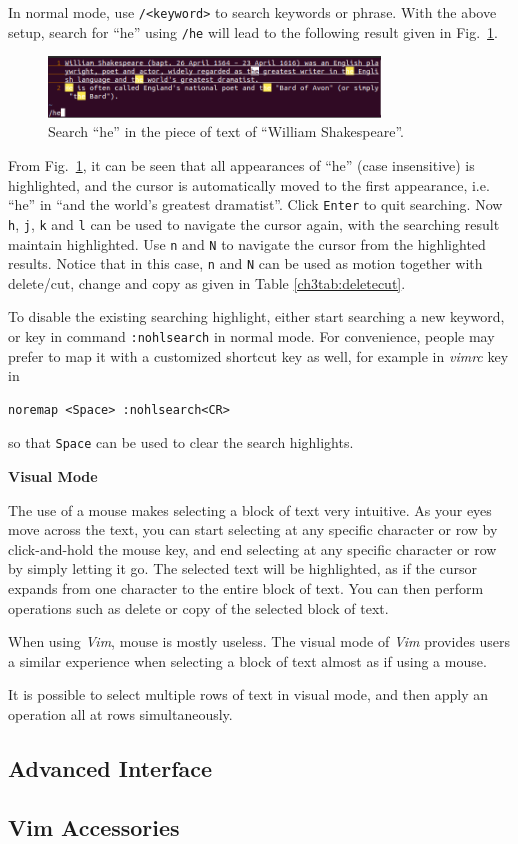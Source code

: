 In normal mode, use \verb|/<keyword>| to search keywords or phrase. With the above setup, search for ``he'' using \verb|/he| will lead to the following result given in Fig.~\ref{ch3fig:vimdemo2}.
\begin{figure}
\centering
\includegraphics[width=250pt]{chapters/chapter3/figures/vimdemo2.png}
\caption{Search ``he'' in the piece of text of ``William Shakespeare''.} \label{ch3fig:vimdemo2}
\end{figure}
From Fig.~\ref{ch3fig:vimdemo2}, it can be seen that all appearances of ``he'' (case insensitive) is highlighted, and the cursor is automatically moved to the first appearance, i.e. ``he'' in ``and the world's greatest dramatist''. Click \verb|Enter| to quit searching. Now \verb|h|, \verb|j|, \verb|k| and \verb|l| can be used to navigate the cursor again, with the searching result maintain highlighted. Use \verb|n| and \verb|N| to navigate the cursor from the highlighted results. Notice that in this case, \verb|n| and \verb|N| can be used as motion together with delete/cut, change and copy as given in Table \ref{ch3tab:deletecut}.

To disable the existing searching highlight, either start searching a new keyword, or key in command \verb|:nohlsearch| in normal mode. For convenience, people may prefer to map it with a customized shortcut key as well, for example in \textit{vimrc} key in
\begin{verbatim}
noremap <Space> :nohlsearch<CR>
\end{verbatim}
so that \verb|Space| can be used to clear the search highlights.

\vspace{0.1in}
\noindent \textbf{Visual Mode}
\vspace{0.1in}

The use of a mouse makes selecting a block of text very intuitive. As your eyes move across the text, you can start selecting at any specific character or row by click-and-hold the mouse key, and end selecting at any specific character or row by simply letting it go. The selected text will be highlighted, as if the cursor expands from one character to the entire block of text. You can then perform operations such as delete or copy of the selected block of text.

When using \textit{Vim}, mouse is mostly useless. The visual mode of \textit{Vim} provides users a similar experience when selecting a block of text almost as if using a mouse.

It is possible to select multiple rows of text in visual mode, and then apply an operation all at rows simultaneously.



\subsection{Advanced Interface}


\subsection{Vim Accessories}



